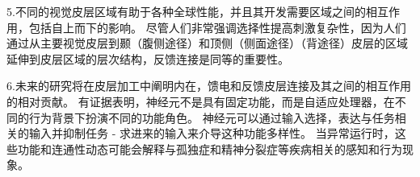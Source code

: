 5.不同的视觉皮层区域有助于各种全球性能，并且其开发需要区域之间的相互作用，包括自上而下的影响。
尽管人们非常强调选择性提高刺激复杂性，因为人们通过从主要视觉皮层到颞（腹侧途径）和顶侧（侧面途径）（背途径）皮层的区域延伸到皮层区域的层次结构，反馈连接是同等的重要性。 


6.未来的研究将在皮层加工中阐明内在，馈电和反馈皮层连接及其之间的相互作用的相对贡献。
有证据表明，神经元不是具有固定功能，而是自适应处理器，在不同的行为背景下扮演不同的功能角色。
神经元可以通过输入选择，表达与任务相关的输入并抑制任务 - 求进来的输入来介导这种功能多样性。
当异常运行时，这些功能和连通性动态可能会解释与孤独症和精神分裂症等疾病相关的感知和行为现象。


